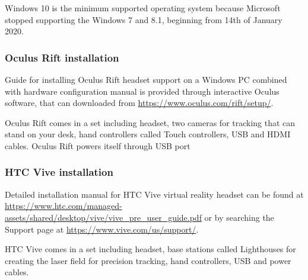 Windows 10 is the minimum supported operating system because Microsoft stopped supporting the Windows 7 and 8.1, beginning from 14th of January 2020.

\subsubsection*{Oculus Rift installation}\label{rift-installation}

Guide for installing Oculus Rift headset support on a Windows PC combined with hardware configuration manual is provided through interactive Oculus software, that can downloaded from \url{https://www.oculus.com/rift/setup/}.

Oculus Rift comes in a set including headset, two cameras for tracking that can stand on your desk, hand controllers called Touch controllers, USB and HDMI cables. Oculus Rift powers itself through USB port

\subsubsection*{HTC Vive installation}\label{vive-installation}

Detailed installation manual for HTC Vive virtual reality headset can be found at \url{https://www.htc.com/managed-assets/shared/desktop/vive/vive_pre_user_guide.pdf} or by searching the Support page at \url{ https://www.vive.com/us/support/}.

HTC Vive comes in a set including headset, base stations called Lighthouses for creating the laser field for precision tracking, hand controllers, USB and power cables.
